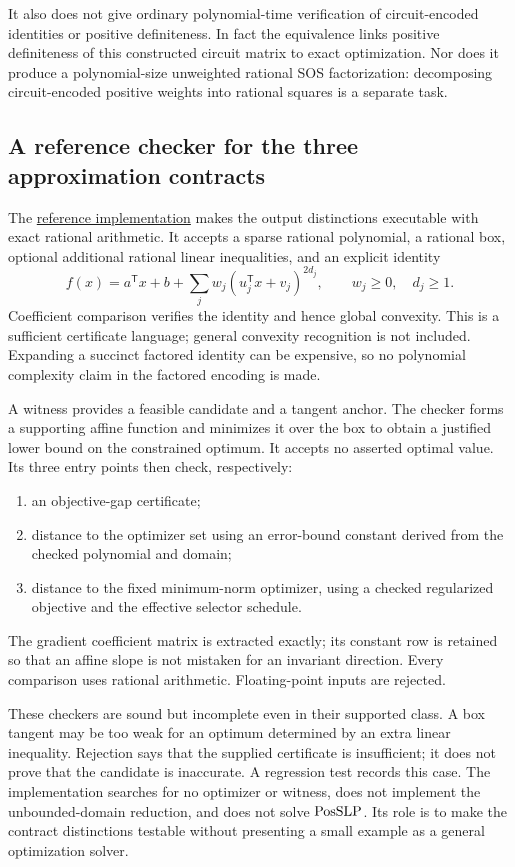 It also does not give ordinary polynomial-time verification of
circuit-encoded identities or positive definiteness. In fact the equivalence
links positive definiteness of this constructed circuit matrix to exact
optimization. Nor does it produce a polynomial-size unweighted rational SOS
factorization: decomposing circuit-encoded positive weights into rational
squares is a separate task.

\subsection{A reference checker for the three approximation contracts}

The \href{../implementation/README.md}{reference implementation} makes the
output distinctions executable with exact rational arithmetic. It accepts a
sparse rational polynomial, a rational box, optional additional rational
linear inequalities, and an explicit identity
\[
 f(x)=a^{\mathsf T}x+b+
           \sum_j w_j(u_j^{\mathsf T}x+v_j)^{2d_j},
 \qquad w_j\ge0,\quad d_j\ge1.
\]
Coefficient comparison verifies the identity and hence global convexity.
This is a sufficient certificate language; general convexity recognition is
not included. Expanding a succinct factored identity can be expensive, so no
polynomial complexity claim in the factored encoding is made.

A witness provides a feasible candidate and a tangent anchor. The checker
forms a supporting affine function and minimizes it over the box to obtain
a justified lower bound on the constrained optimum. It accepts no asserted
optimal value. Its three entry points then check, respectively:
\begin{enumerate}
\item an objective-gap certificate;
\item distance to the optimizer set using an error-bound constant derived
      from the checked polynomial and domain;
\item distance to the fixed minimum-norm optimizer, using a checked
      regularized objective and the effective selector schedule.
\end{enumerate}
The gradient coefficient matrix is extracted exactly; its constant row is
retained so that an affine slope is not mistaken for an invariant direction.
Every comparison uses rational arithmetic. Floating-point inputs are
rejected.

These checkers are sound but incomplete even in their supported class. A box
tangent may be too weak for an optimum determined by an extra linear
inequality. Rejection says that the supplied certificate is insufficient;
it does not prove that the candidate is inaccurate. A regression test
records this case. The implementation searches for no optimizer or witness,
does not implement the unbounded-domain reduction, and does not solve
$\mathrm{PosSLP}$. Its role is to make the contract distinctions testable without
presenting a small example as a general optimization solver.


